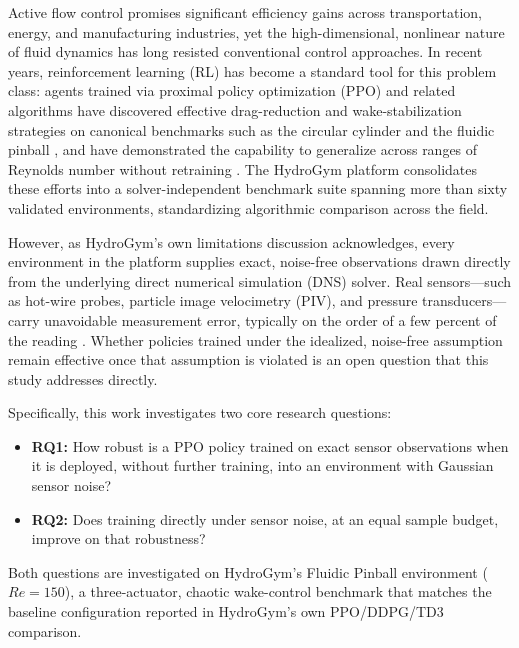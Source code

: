 \documentclass[11pt,a4paper]{article}
\begin{document}
Active flow control promises significant efficiency gains across transportation, energy, and manufacturing industries, yet the high-dimensional, nonlinear nature of fluid dynamics has long resisted conventional control approaches. In recent years, reinforcement learning (RL) has become a standard tool for this problem class: agents trained via proximal policy optimization (PPO) and related algorithms have discovered effective drag-reduction and wake-stabilization strategies on canonical benchmarks such as the circular cylinder and the fluidic pinball \cite{rabault2019, deng2020}, and have demonstrated the capability to generalize across ranges of Reynolds number without retraining \cite{tang2020}. The HydroGym platform \cite{lagemann2026} consolidates these efforts into a solver-independent benchmark suite spanning more than sixty validated environments, standardizing algorithmic comparison across the field.

However, as HydroGym's own limitations discussion acknowledges, every environment in the platform supplies exact, noise-free observations drawn directly from the underlying direct numerical simulation (DNS) solver. Real sensors---such as hot-wire probes, particle image velocimetry (PIV), and pressure transducers---carry unavoidable measurement error, typically on the order of a few percent of the reading \cite{sciacchitano2019, rezaeiravesh2018}. Whether policies trained under the idealized, noise-free assumption remain effective once that assumption is violated is an open question that this study addresses directly.

Specifically, this work investigates two core research questions:
\begin{itemize}
    \item \textbf{RQ1:} How robust is a PPO policy trained on exact sensor observations when it is deployed, without further training, into an environment with Gaussian sensor noise?
    \item \textbf{RQ2:} Does training directly under sensor noise, at an equal sample budget, improve on that robustness?
\end{itemize}
Both questions are investigated on HydroGym's Fluidic Pinball environment ($Re=150$), a three-actuator, chaotic wake-control benchmark that matches the baseline configuration reported in HydroGym's own PPO/DDPG/TD3 comparison.
\end{document}
